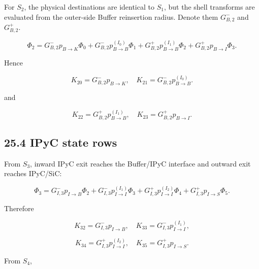 \documentclass[11pt,a4paper]{article}
\begin{document}
For $S_2$, the physical destinations are identical to $S_1$, but the shell transforms are evaluated from the outer-side Buffer reinsertion radius. Denote them $G_{B,2}^-$ and $G_{B,2}^+$.

\begin{equation}
\Phi_2=
G_{B,2}^-p_{B\rightarrow K}\Phi_0+
G_{B,2}^-p_{B\rightarrow B}^{(I_0)}\Phi_1+
G_{B,2}^+p_{B\rightarrow B}^{(I_1)}\Phi_2+
G_{B,2}^+p_{B\rightarrow I}\Phi_3.
\tag{TRISO-MR-034}
\label{eq:triso-mr-034}
\end{equation}

Hence

\begin{equation}
K_{20}=G_{B,2}^-p_{B\rightarrow K},
\quad
K_{21}=G_{B,2}^-p_{B\rightarrow B}^{(I_0)}.
\tag{TRISO-MR-035}
\label{eq:triso-mr-035}
\end{equation}

and

\begin{equation}
K_{22}=G_{B,2}^+p_{B\rightarrow B}^{(I_1)},
\quad
K_{23}=G_{B,2}^+p_{B\rightarrow I}.
\tag{TRISO-MR-036}
\label{eq:triso-mr-036}
\end{equation}

\subsection*{25.4 IPyC state rows}

From $S_3$, inward IPyC exit reaches the Buffer/IPyC interface and outward exit reaches IPyC/SiC:

\begin{equation}
\Phi_3=
G_{I,3}^-p_{I\rightarrow B}\Phi_2+
G_{I,3}^-p_{I\rightarrow I}^{(I_1)}\Phi_3+
G_{I,3}^+p_{I\rightarrow I}^{(I_2)}\Phi_4+
G_{I,3}^+p_{I\rightarrow S}\Phi_5.
\tag{TRISO-MR-037}
\label{eq:triso-mr-037}
\end{equation}

Therefore

\begin{equation}
K_{32}=G_{I,3}^-p_{I\rightarrow B},
\quad
K_{33}=G_{I,3}^-p_{I\rightarrow I}^{(I_1)},
\tag{TRISO-MR-038}
\label{eq:triso-mr-038}
\end{equation}

\begin{equation}
K_{34}=G_{I,3}^+p_{I\rightarrow I}^{(I_2)},
\quad
K_{35}=G_{I,3}^+p_{I\rightarrow S}.
\tag{TRISO-MR-039}
\label{eq:triso-mr-039}
\end{equation}

From $S_4$,
\end{document}
